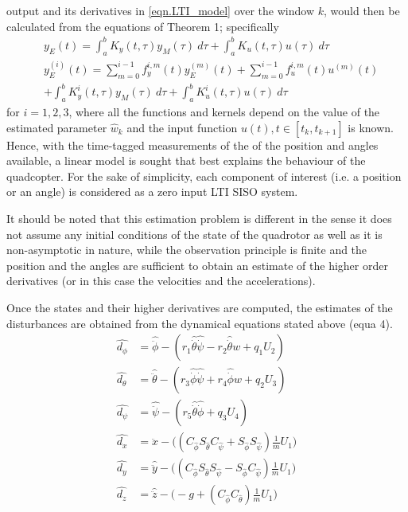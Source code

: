 \documentclass{article}
\begin{document}
output and its derivatives in \eqref{eqn.LTI_model} over the window $k$, would then be calculated  from the equations of Theorem 1; specifically
 \begin{align} \label{eq:evalEST} 
& y_E(t) = \int_a^b K_{y}(t,\tau) y_M(\tau) \ d \tau + \int_a^b K_{u}(t,\tau) u(\tau) \ d \tau \\
& y_E^{(i)}(t) = \sum_{m=0}^{i-1} f_y^{i,m}(t) y_E^{(m)}(t) + \sum_{m=0}^{i-1} f_u^{i,m}(t) u^{(m)}(t) \nonumber \\
& + \int_a^b K_{y}^{i} (t,\tau) y_M(\tau) \ d \tau + \int_a^b K_{u}^{i} (t,\tau) u(\tau) \ d \tau \ 
\end{align}
for $i=1,2,3$, where all the functions and kernels depend on the value of the estimated parameter $\hat{w}_k$ and the input function $u(t), t\in [t_k,t_{k+1}]$ is known. \\[-3mm]




Hence, with the time-tagged measurements of the of the position and angles available, a linear model is sought that best explains the behaviour of the quadcopter. For the sake of simplicity, each component of interest (i.e. a position or an angle) is considered as a zero input LTI SISO system.

It should be noted that this estimation problem is different in the sense it does not assume any initial conditions of the state of the quadrotor as well as it is non-asymptotic in nature, while the observation principle is finite and the position and the angles are sufficient to obtain an estimate of the higher order derivatives (or in this case the velocities and the accelerations).



Once the states and their higher derivatives are computed, the estimates of the disturbances are obtained from the dynamical equations stated above (equa 4). 
\begin{equation}
	\label{eq:KDO}
    \begin{aligned}
    \hat{d_\phi}&=\hat{\ddot{\phi}}-(r_1\hat{\dot{\theta}}\hat{\dot{\psi}}-r_2\hat{\dot{\theta}}w+q_1U_2)\\
    \hat{d_\theta}&=\hat{\ddot{\theta}}-(r_3\hat{\dot{\phi}}\hat{\dot{\psi}}+r_4\hat{\dot{\phi}}w+q_2U_3)\\
    \hat{d_\psi}&=\hat{\ddot{\psi}}-(r_5\hat{\dot{\theta}}\hat{\dot{\phi}}+q_3U_4)\\
    \hat{d_x}&=\hat{\ddot{x}}-\Big((C_{\hat{\phi}}S_{\hat{\theta}}C_{\hat{\psi}}+S_{\hat{\phi}}S_{\hat{\psi}})\frac{1}{m}U_1\Big)\\
    \hat{d_y}&=\hat{\ddot{y}}-\Big((C_{\hat{\phi}}S_{\hat{\theta}}S_{\hat{\psi}}-S_{\hat{\phi}}C_{\hat{\psi}})\frac{1}{m}U_1\Big)\\
    \hat{d_z}&=\hat{\ddot{z}}-\Big(-g+(C_{\hat{\phi}}C_{\hat{\theta}})\frac{1}{m}U_1\Big)
    \end{aligned}
\end{equation}
\end{document}
